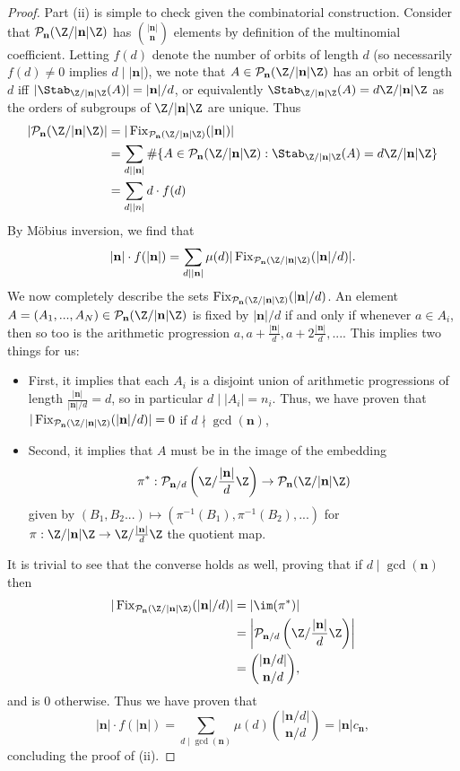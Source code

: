 \documentclass[12pt]{amsart}
\theoremstyle{plain}
\begin{document}
\begin{proof}
Part (ii) is simple to check given the combinatorial construction. Consider that $\mathcal{P}_\mathbf{n}(\Z/|\mathbf{n}|\Z)$ has ${|\mathbf{n}|\choose \mathbf{n}}$ elements by definition of the multinomial coefficient. Letting $f(d)$ denote the number of orbits of length $d$ (so necessarily $f(d)\ne 0$ implies $d\mid |\mathbf{n}|$), we note that $A\in \mathcal{P}_\mathbf{n}(\Z/|\mathbf{n}|\Z)$ has an orbit of length $d$ iff $|\Stab_{\Z/|\mathbf{n}|\Z}(A)|=|\mathbf{n}|/d$, or equivalently $\Stab_{\Z/|\mathbf{n}|\Z}(A) = d\Z/|\mathbf{n}|\Z$ as the orders of subgroups of $\Z/|\mathbf{n}|\Z$ are unique. Thus
\begin{align*}
|\mathcal{P}_\mathbf{n}(\Z/|\mathbf{n}|\Z)| &=|\operatorname{Fix}_{\mathcal{P}_\mathbf{n}(\Z/|\mathbf{n}|\Z)}(|\mathbf{n}|)|\\
&=\sum_{d\mid |\mathbf{n}|}\#\{A\in \mathcal{P}_\mathbf{n}(\Z/|\mathbf{n}|\Z) : \Stab_{\Z/|\mathbf{n}|\Z}(A)=d\Z/|\mathbf{n}|\Z\}\\
&=\sum_{d\mid |n|} d\cdot f(d)
\end{align*}
By M\"obius inversion, we find that
\[
|\mathbf{n}|\cdot f(|\mathbf{n}|) = \sum_{d\mid |\mathbf{n}|} \mu(d) |\operatorname{Fix}_{\mathcal{P}_{\mathbf{n}}(\Z/|\mathbf{n}|\Z)}(|\mathbf{n}|/d)|.
\]
We now completely describe the sets $\operatorname{Fix}_{\mathcal{P}_{\mathbf{n}}(\Z/|\mathbf{n}|\Z)}(|\mathbf{n}|/d)$. An element $A=(A_1,...,A_N)\in \mathcal{P}_{\mathbf{n}}(\Z/|\mathbf{n}|\Z)$ is fixed by $|\mathbf{n}|/d$ if and only if whenever $a\in A_i$, then so too is the arithmetic progression $a, a+\frac{|\mathbf{n}|}{d}, a+ 2\frac{|\mathbf{n}|}{d}, ...$. This implies two things for us:
\begin{itemize}
    \item First, it implies that each $A_i$ is a disjoint union of arithmetic progressions of length $\frac{|\mathbf{n}|}{|\mathbf{n}|/d}=d$, so in particular $d\mid |A_i|=n_i$. Thus, we have proven that $|\operatorname{Fix}_{\mathcal{P}_{\mathbf{n}}(\Z/|\mathbf{n}|\Z)}(|\mathbf{n}|/d)|=0$ if $d\nmid \gcd(\mathbf{n})$,
    \item Second, it implies that $A$ must be in the image of the embedding
    \[
    \pi^*:\mathcal{P}_{\mathbf{n}/d}\left(\Z/\frac{|\mathbf{n}|}{d}\Z\right) \to \mathcal{P}_\mathbf{n}(\Z/|\mathbf{n}|\Z)
    \]
    given by $(B_1,B_2...)\mapsto (\pi^{-1}(B_1),\pi^{-1}(B_2),...)$ for $\pi:\Z/|\mathbf{n}|\Z\to\Z/\frac{|\mathbf{n}|}{d}\Z$ the quotient map.
\end{itemize}
It is trivial to see that the converse holds as well, proving that if $d\mid \gcd(\mathbf{n})$ then
\begin{align*}
|\operatorname{Fix}_{\mathcal{P}_{\mathbf{n}}(\Z/|\mathbf{n}|\Z)}(|\mathbf{n}|/d)| &= |\im(\pi^*)|\\
&= \left\lvert\mathcal{P}_{\mathbf{n}/d}\left(\Z/\frac{|\mathbf{n}|}{d}\Z\right)\right\rvert\\
&= {|\mathbf{n}/d|\choose \mathbf{n}/d},
\end{align*}
and is $0$ otherwise. Thus we have proven that
\[
|\mathbf{n}|\cdot f(|\mathbf{n}|) = \sum_{d\mid \gcd(\mathbf{n})} \mu(d){|\mathbf{n}/d|\choose \mathbf{n}/d} = |\mathbf{n}|c_\mathbf{n},
\]
concluding the proof of (ii).


\end{proof}
\end{document}
